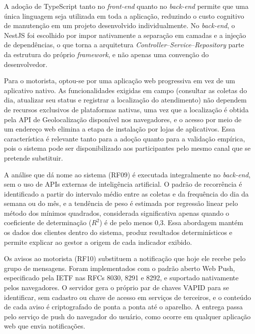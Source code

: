
A adoção de TypeScript tanto no \textit{front-end} quanto no \textit{back-end} permite que uma única linguagem seja utilizada em toda a aplicação, reduzindo o custo cognitivo de manutenção em um projeto desenvolvido individualmente. No \textit{back-end}, o NestJS foi escolhido por impor nativamente a separação em camadas e a injeção de dependências, o que torna a arquitetura \textit{Controller}--\textit{Service}--\textit{Repository} parte da estrutura do próprio \textit{framework}, e não apenas uma convenção do desenvolvedor.

Para o motorista, optou-se por uma aplicação web progressiva em vez de um aplicativo nativo. As funcionalidades exigidas em campo (consultar as coletas do dia, atualizar seu status e registrar a localização do atendimento) não dependem de recursos exclusivos de plataformas nativas, uma vez que a localização é obtida pela API de Geolocalização disponível nos navegadores, e o acesso por meio de um endereço web elimina a etapa de instalação por lojas de aplicativos. Essa característica é relevante tanto para a adoção quanto para a validação empírica, pois o sistema pode ser disponibilizado aos participantes pelo mesmo canal que se pretende substituir.

A análise que dá nome ao sistema (RF09) é executada integralmente no \textit{back-end}, sem o uso de APIs externas de inteligência artificial. O padrão de recorrência é identificado a partir do intervalo médio entre as coletas e da frequência do dia da semana ou do mês, e a tendência de peso é estimada por regressão linear pelo método dos mínimos quadrados, considerada significativa apenas quando o coeficiente de determinação ($R^2$) é de pelo menos 0,3. Essa abordagem mantém os dados dos clientes dentro do sistema, produz resultados determinísticos e permite explicar ao gestor a origem de cada indicador exibido.

Os avisos ao motorista (RF10) substituem a notificação que hoje ele recebe pelo grupo de mensagens. Foram implementados com o padrão aberto Web Push, especificado pela IETF nas RFCs 8030, 8291 e 8292, e suportado nativamente pelos navegadores. O servidor gera o próprio par de chaves VAPID para se identificar, sem cadastro ou chave de acesso em serviços de terceiros, e o conteúdo de cada aviso é criptografado de ponta a ponta até o aparelho. A entrega passa pelo serviço de push do navegador do usuário, como ocorre em qualquer aplicação web que envia notificações.

